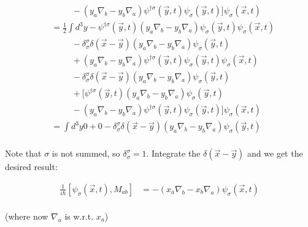 \begin{align*}
    &\hspace{1cm}-(y_a \nabla_b - y_b \nabla_a)\psi^{\dagger\sigma}(\vec{y},t)\psi_{\sigma}(\vec{y},t)]\psi_\sigma(\vec{x},t) \\
    &= \frac{1}{2}\int d^3y 
    -\psi^{\dagger\sigma}(\vec{y},t)(y_a \nabla_b - y_b \nabla_a)\psi_{\sigma}(\vec{y},t)\psi_\sigma(\vec{x},t) \\
    &\hspace{1cm}- \delta_\sigma^\sigma \delta(\vec{x}-\vec{y})(y_a \nabla_b - y_b \nabla_a)\psi_{\sigma}(\vec{y},t) \\
    &\hspace{1cm}+(y_a \nabla_b - y_b \nabla_a)\psi^{\dagger\sigma}(\vec{y},t)\psi_\sigma(\vec{y},t)\psi_{\sigma}(\vec{x},t) \\
    &\hspace{1cm}- \delta_\sigma^\sigma \delta(\vec{x}-\vec{y})(y_a \nabla_b - y_b \nabla_a)\psi_{\sigma}(\vec{y},t) \\
    &\hspace{1cm}+[\psi^{\dagger\sigma}(\vec{y},t)(y_a \nabla_b - y_b \nabla_a)\psi_{\sigma}(\vec{y},t) \\
    &\hspace{1cm}-(y_a \nabla_b - y_b \nabla_a)\psi^{\dagger\sigma}(\vec{y},t)\psi_{\sigma}(\vec{y},t)]\psi_\sigma(\vec{x},t) \\
    &= \int d^3y 0 + 0 - \delta_\sigma^\sigma \delta(\vec{x}-\vec{y})(y_a \nabla_b - y_b \nabla_a)\psi_{\sigma}(\vec{y},t) \\
\end{align*}

Note that $\sigma$ is not summed, so $\delta_\sigma^\sigma = 1$. Integrate the $\delta(\vec{x}-\vec{y})$ and we get the desired result:

\begin{align*}
    \frac{1}{i\hbar}[\psi_\sigma(\vec{x},t), M_{ab}] 
    &=  - (x_a \nabla_b - x_b \nabla_a)\psi_{\sigma}(\vec{x},t) \\
\end{align*}

(where now $\nabla_a$ is w.r.t. $x_a$)
